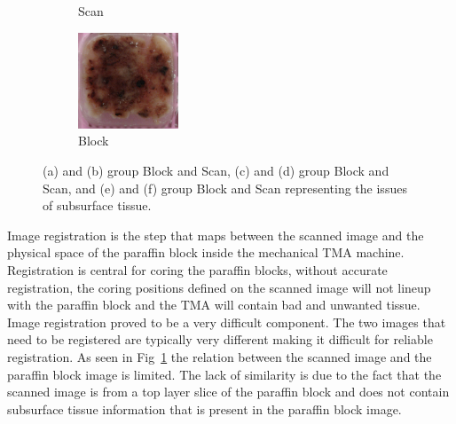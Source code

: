 \documentclass[letterpaper,10pt,oneside]{article}
\begin{document}
\begin{figure}[hbtp]
\begin{subfigure}[b]{.2\textwidth}
    \caption{Scan}
  \end{subfigure}
  \begin{subfigure}[b]{.2\textwidth}
	  \includegraphics[width=3cm]{images/PO14004821_B3.JPG} 
    \caption{Block}
  \end{subfigure}
	\caption{(a) and (b) group Block and Scan, (c) and (d) group Block and Scan, and (e) and (f) group Block and Scan representing the issues of subsurface tissue.}
	\label{fig:subsurface}
\end{figure}
Image registration is the step that maps between the scanned image and the physical space of the paraffin block inside the mechanical TMA machine. Registration is central for coring the paraffin blocks, without accurate registration, the coring positions defined on the scanned image will not lineup with the paraffin block and the TMA will contain bad and unwanted tissue. Image registration proved to be a very difficult component. The two images that need to be registered are typically very different making it difficult for reliable registration. As seen in Fig~\ref{fig:subsurface} the relation between the scanned image and the paraffin block image is limited. The lack of similarity is due to the fact that the scanned image is from a top layer slice of the paraffin block and does not contain subsurface tissue information that is present in the paraffin block image.
\end{document}
